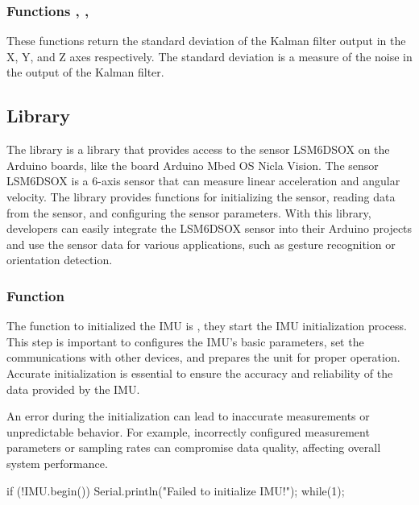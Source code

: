 \subsubsection{Functions , , }
These functions return the standard deviation of the Kalman filter output in the X, Y, and Z axes respectively. The standard deviation is a measure of the noise in the output of the Kalman filter.


\subsection{Library }

The library  is a library that provides access to the sensor LSM6DSOX on the Arduino boards, like the board Arduino Mbed OS Nicla Vision. The sensor LSM6DSOX is a 6-axis sensor that can measure linear acceleration and angular velocity. The library  provides functions for initializing the sensor, reading data from the sensor, and configuring the sensor parameters. With this library, developers can easily integrate the LSM6DSOX sensor into their Arduino projects and use the sensor data for various applications, such as gesture recognition or orientation detection.\cite{arduino:2021lsm6dsox}


\subsubsection{Function }


The function to initialized the IMU is , they start the IMU initialization process. This step is important to configures the IMU's basic parameters, set the communications with other devices, and prepares the unit for proper operation. Accurate initialization is essential to ensure the accuracy and reliability of the data provided by the IMU.

An error during the initialization can lead to inaccurate measurements or unpredictable behavior. For example, incorrectly configured measurement parameters or sampling rates can compromise data quality, affecting overall system performance.


\begin{Arduino}
	if (!IMU.begin()) {
		Serial.println("Failed to initialize IMU!");
		while(1){};	}
\end{Arduino}



